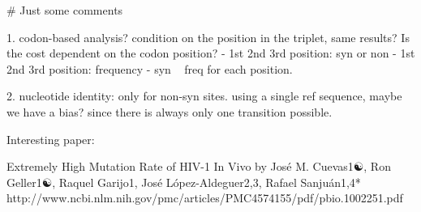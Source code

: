 # Just some comments

1. codon-based analysis?  condition on the position in the triplet, same results?
Is the cost dependent on the codon position? 
    - 1st 2nd 3rd position: syn or non
    - 1st 2nd 3rd position: frequency
    - syn ~ freq for each position. 

2. nucleotide identity: only for non-syn sites.  using a single ref sequence, maybe we have a bias? since there is always only one transition possible. 



Interesting paper: 

Extremely High Mutation Rate of HIV-1 In Vivo by José M. Cuevas1☯, Ron Geller1☯, Raquel Garijo1, José López-Aldeguer2,3, Rafael Sanjuán1,4*
 http://www.ncbi.nlm.nih.gov/pmc/articles/PMC4574155/pdf/pbio.1002251.pdf